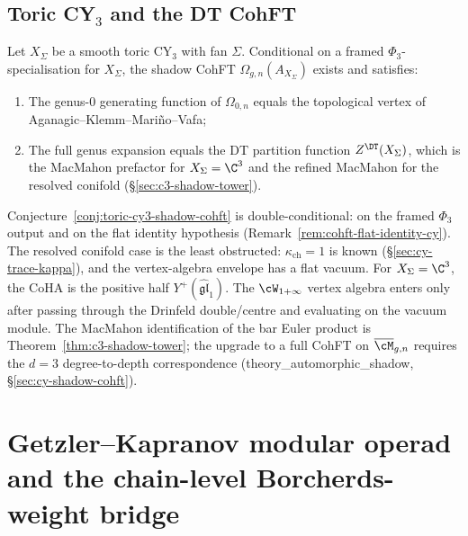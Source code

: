 \subsection{Toric CY\texorpdfstring{$_3$}{-3} and the DT CohFT}

\begin{conjecture}
\label{conj:toric-cy3-shadow-cohft}
\ClaimStatusConjectured
Let $X_\Sigma$ be a smooth toric CY$_3$ with fan $\Sigma$. Conditional on a framed $\Phi_3$-specialisation for $X_\Sigma$, the shadow CohFT $\Omega_{g,n}(A_{X_\Sigma})$ exists and satisfies:
\begin{enumerate}[label=(\roman*)]
 \item The genus-$0$ generating function of $\Omega_{0,n}$ equals the topological vertex of Aganagic--Klemm--Mari\~no--Vafa;
 \item The full genus expansion equals the DT partition function $Z^{\DT}(X_\Sigma)$, which is the MacMahon prefactor for $X_\Sigma = \C^3$ and the refined MacMahon for the resolved conifold (\S\ref{sec:c3-shadow-tower}).
\end{enumerate}
\end{conjecture}

\begin{remark}[Scope]
\label{rem:toric-cohft-scope}
Conjecture~\ref{conj:toric-cy3-shadow-cohft} is double-conditional: on the framed $\Phi_3$ output and on the flat identity hypothesis (Remark~\ref{rem:cohft-flat-identity-cy}). The resolved conifold case is the least obstructed: $\kappa_{\mathrm{ch}} = 1$ is known (\S\ref{sec:cy-trace-kappa}), and the vertex-algebra envelope has a flat vacuum. For $X_\Sigma = \C^3$, the CoHA is the positive half $Y^+(\widehat{\mathfrak{gl}}_1)$.
The $\cW_{1+\infty}$ vertex algebra enters only after passing through the Drinfeld double/centre and evaluating on the vacuum module. The MacMahon identification of the bar Euler product is Theorem~\ref{thm:c3-shadow-tower}; the upgrade to a full CohFT on $\overline{\cM}_{g,n}$ requires the $d = 3$ degree-to-depth correspondence (theory\_automorphic\_shadow, \S\ref{sec:cy-shadow-cohft}).
\end{remark}



\section{Getzler--Kapranov modular operad and the chain-level
Borcherds-weight bridge}
\label{sec:gk-borcherds-chain-level-bridge}

